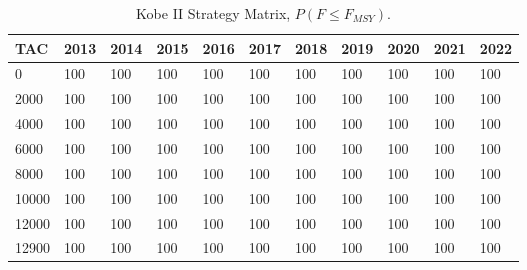 \documentclass[a4paper, 10pt]{article}
\begin{document}
%
\begin{table}[!tbp]
\caption{Kobe II Strategy Matrix, $P(F\leq F_{MSY})$.\label{kobeShade}} 
\begin{center}
\begin{tabular}{lllllllllll}
\hline\hline
\multicolumn{1}{l}{TAC}&\multicolumn{1}{c}{2013}&\multicolumn{1}{c}{2014}&\multicolumn{1}{c}{2015}&\multicolumn{1}{c}{2016}&\multicolumn{1}{c}{2017}&\multicolumn{1}{c}{2018}&\multicolumn{1}{c}{2019}&\multicolumn{1}{c}{2020}&\multicolumn{1}{c}{2021}&\multicolumn{1}{c}{2022}\tabularnewline
\hline
0&\cellcolor{gray50} 100&\cellcolor{gray50} 100&\cellcolor{gray50} 100&\cellcolor{gray50} 100&\cellcolor{gray50} 100&\cellcolor{gray50} 100&\cellcolor{gray50} 100&\cellcolor{gray50} 100&\cellcolor{gray50} 100&\cellcolor{gray50} 100\tabularnewline
2000&\cellcolor{gray50} 100&\cellcolor{gray50} 100&\cellcolor{gray50} 100&\cellcolor{gray50} 100&\cellcolor{gray50} 100&\cellcolor{gray50} 100&\cellcolor{gray50} 100&\cellcolor{gray50} 100&\cellcolor{gray50} 100&\cellcolor{gray50} 100\tabularnewline
4000&\cellcolor{gray50} 100&\cellcolor{gray50} 100&\cellcolor{gray50} 100&\cellcolor{gray50} 100&\cellcolor{gray50} 100&\cellcolor{gray50} 100&\cellcolor{gray50} 100&\cellcolor{gray50} 100&\cellcolor{gray50} 100&\cellcolor{gray50} 100\tabularnewline
6000&\cellcolor{gray50} 100&\cellcolor{gray50} 100&\cellcolor{gray50} 100&\cellcolor{gray50} 100&\cellcolor{gray50} 100&\cellcolor{gray50} 100&\cellcolor{gray50} 100&\cellcolor{gray50} 100&\cellcolor{gray50} 100&\cellcolor{gray50} 100\tabularnewline
8000&\cellcolor{gray50} 100&\cellcolor{gray50} 100&\cellcolor{gray50} 100&\cellcolor{gray50} 100&\cellcolor{gray50} 100&\cellcolor{gray50} 100&\cellcolor{gray50} 100&\cellcolor{gray50} 100&\cellcolor{gray50} 100&\cellcolor{gray50} 100\tabularnewline
10000&\cellcolor{gray50} 100&\cellcolor{gray50} 100&\cellcolor{gray50} 100&\cellcolor{gray50} 100&\cellcolor{gray50} 100&\cellcolor{gray50} 100&\cellcolor{gray50} 100&\cellcolor{gray50} 100&\cellcolor{gray50} 100&\cellcolor{gray50} 100\tabularnewline
12000&\cellcolor{gray50} 100&\cellcolor{gray50} 100&\cellcolor{gray50} 100&\cellcolor{gray50} 100&\cellcolor{gray50} 100&\cellcolor{gray50} 100&\cellcolor{gray50} 100&\cellcolor{gray50} 100&\cellcolor{gray50} 100&\cellcolor{gray50} 100\tabularnewline
12900&\cellcolor{gray50} 100&\cellcolor{gray50} 100&\cellcolor{gray50} 100&\cellcolor{gray50} 100&\cellcolor{gray50} 100&\cellcolor{gray50} 100&\cellcolor{gray50} 100&\cellcolor{gray50} 100&\cellcolor{gray50} 100&\cellcolor{gray50} 100\tabularnewline

\end{tabular}
\end{center}
\end{table}
\end{document}
